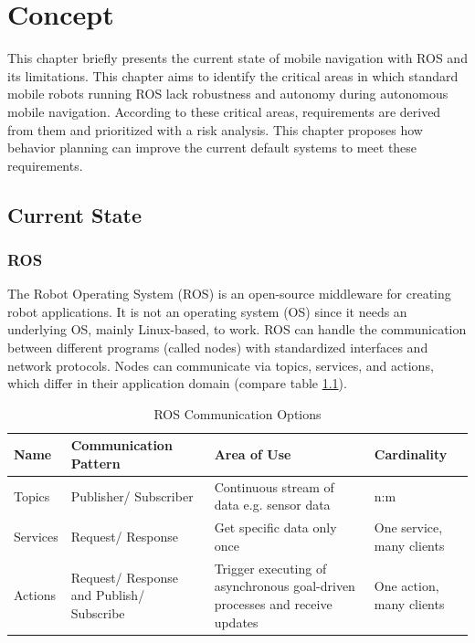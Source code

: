 \chapter{Concept}
\label{cha:methoden}

This chapter briefly presents the current state of mobile navigation with ROS and its limitations. 
This chapter aims to identify the critical areas in which standard mobile robots running ROS lack robustness and autonomy during autonomous mobile navigation. According to these critical areas, requirements are derived from them and prioritized with a risk analysis. 
This chapter proposes how behavior planning can improve the current default systems to meet these requirements. 

\section{Current State}
\subsection{ROS}
The Robot Operating System (ROS) is an open-source middleware for creating robot applications. It is not an operating system (OS) since it needs an underlying OS, mainly Linux-based, to work. 
ROS can handle the communication between different programs (called nodes) with standardized interfaces and network protocols. Nodes can communicate via topics, services, and actions, which differ in their application domain (compare table \ref{tab:ros_interfaces}). 

\begin{table}[ht]
	\label{tab:ros_interfaces}
	\caption{ROS Communication Options}
	\begin{tabular}{ | m{} | m{}| m{} | m{}|} 
  	\hline
  	Name & Communication Pattern & Area of Use & Cardinality \\ 
  	\hline
  	Topics & Publisher/ Subscriber & Continuous stream of data e.g. sensor data &  n:m \\ 
  	\hline
  	Services & Request/ Response & Get specific data only once & One service, many clients \\ 
  	\hline
  	Actions & Request/ Response and Publish/ Subscribe & Trigger executing of asynchronous goal-driven processes and receive updates & One action, many clients \\
  	\hline
	\end{tabular}
\end{table}

